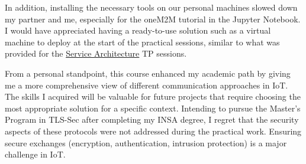 \noindent In addition, installing the necessary tools on our personal machines slowed down my partner and me, especially for the oneM2M tutorial in the Jupyter Notebook. I would have appreciated having a ready-to-use solution such as a virtual machine to deploy at the start of the practical sessions, similar to what was provided for the \hyperref[sec:service_architecture]{Service Architecture} TP sessions.
\vspace{0.25cm}

\noindent From a personal standpoint, this course enhanced my academic path by giving me a more comprehensive view of different communication approaches in IoT. The skills I acquired will be valuable for future projects that require choosing the most appropriate solution for a specific context.
Intending to pursue the Master's Program in TLS-Sec after completing my INSA degree, I regret that the security aspects of these protocols were not addressed during the practical work. Ensuring secure exchanges (encryption, authentication, intrusion protection) is a major challenge in IoT.
